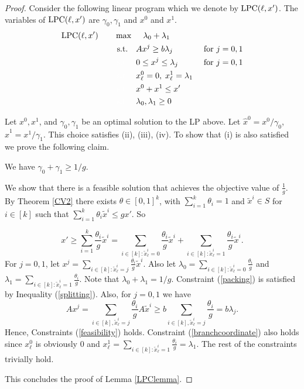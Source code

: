 \begin{proof}	
	Consider the following linear program which we denote by $\operatorname{{{LPC}}}(\ell,x')$. The variables of $\operatorname{{{LPC}}}(\ell,x')$ are $\gamma_0,\gamma_1$ and $x^0$ and $x^1$. 
	\begin{align}
	\LPC(\ell,x')\quad\quad& \max\quad \;\lambda_0+\lambda_1\\
	&\;\text{s.t.} \quad Ax^j \geq b\lambda_j & \mbox{ for $j=0,1$} \label{feasibility}\\
	&\;{\color{white}{\text{s.t.}} }\quad 0 \leq x^j \leq \lambda_j &\mbox{ for $j=0,1$}\label{bound}\\
	&\;{\color{white}{\text{s.t.}} }\quad x^0_\ell = 0,\; x^1_\ell =\lambda_1\label{branchcoordinate}\\
	&\;{\color{white}{\text{s.t.}} }\quad x^0 + x^1 \leq x'\label{packing}\\
	&\;{\color{white}{\text{s.t.}} }\quad \lambda_0,\lambda_1 \geq 0
	\end{align}
	
	Let $x^0,x^1$, and $\gamma_0,\gamma_1$ be an optimal solution to the LP above. Let $\hat{x}^0 = x^0/\gamma_0$, $\hat{x}^1=x^1/\gamma_1$. This choice satisfies  (ii), (iii), (iv). To show that (i) is also satisfied we prove the following claim.
	
	\begin{claim}\label{CVexists}
		We have $\gamma_0 + \gamma_1\geq 1/g$.
	\end{claim}
	\begin{cproof}
		We show that there is a feasible solution that achieves the objective value of $\frac{1}{g}$. By Theorem \ref{CV2} there exists $\theta \in [0,1]^k$, with $\sum_{i=1}^{k}\theta_i = 1$ and $\tilde{x}^i\in S$ for $i\in[k]$ such that 
		$\sum_{i=1}^{k}\theta_i \tilde{x}^i\leq gx'$. So
		
		\begin{equation}\label{splitting}
		x'\geq \sum_{i=1}^{k}\frac{\theta_i}{g} \tilde{x}^i
		={\sum_{i\in [k]: \tilde{x}^i_\ell =0}\frac{\theta_i}{g} \tilde{x}^i}+{\sum_{i\in [k]: \tilde{x}^i_\ell =1}\frac{\theta_i}{g} \tilde{x}^i}.
		\end{equation}
		For $j=0,1$, let $x^j = \sum_{i\in [k]:\tilde{x}^i_\ell=j} \frac{\theta_i}{g}\tilde{x}^i$. Also let $\lambda_0=\sum_{i\in [k]: \tilde{x}^i_\ell =0}\frac{\theta_i}{g}$ and $\lambda_1 = \sum_{i\in [k]: \tilde{x}^i_\ell =1}\frac{\theta_i}{g}$. Note that $\lambda_0+\lambda_1 =1/g$. Constraint (\ref{packing}) is satisfied by Inequality (\ref{splitting}). Also, for $j=0,1$ we have
		\begin{equation}
		Ax^j= \sum_{i\in[k], \tilde{x}^i_\ell = j} \frac{\theta_i}{g} A\tilde{x}^i  \geq b \sum_{i\in[k], \tilde{x}^i_\ell = j} \frac{\theta_i}{g} = b\lambda_j.
		\end{equation}
		Hence, Constraints (\ref{feasibility}) holds. Constraint (\ref{branchcoordinate}) also holds since $x^0_\ell$ is obviously $0$ and $x^1_\ell= \sum_{i\in [k]: \tilde{x}^i_\ell = 1}\frac{\theta_i}{g}= \lambda_1$. The rest of the constraints trivially hold. 
	\end{cproof}
	This concludes the proof of Lemma \ref{LPClemma}.	
\end{proof}

